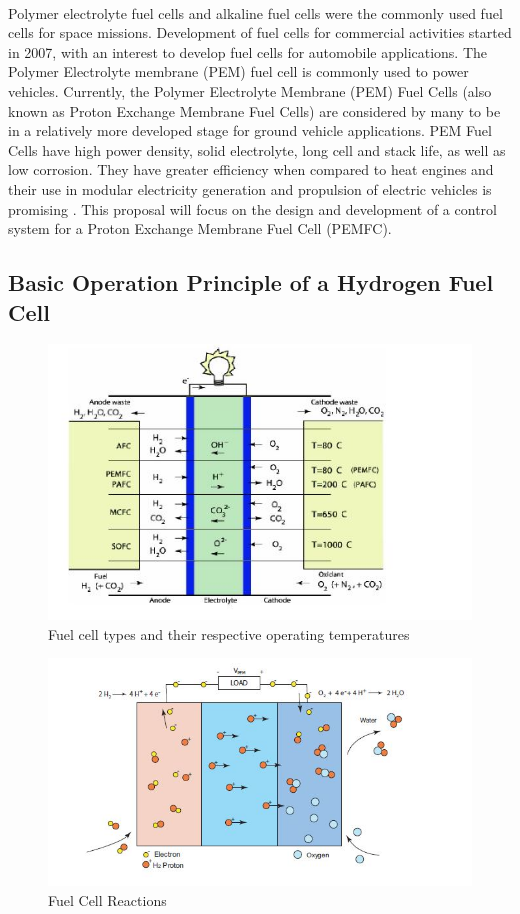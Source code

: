 \paragraph{}Polymer electrolyte fuel cells and alkaline fuel cells were the commonly used fuel cells for space missions. Development of fuel cells for commercial activities started in 2007, with an interest to develop fuel cells for automobile applications. The Polymer Electrolyte membrane (PEM) fuel cell is commonly used to power vehicles. Currently, the Polymer Electrolyte Membrane (PEM) Fuel Cells (also known as Proton Exchange Membrane Fuel Cells) are considered by many to be in a relatively more developed stage for ground vehicle applications. PEM Fuel Cells have high power density, solid electrolyte, long cell and stack life, as well as low corrosion. They have greater eﬃciency when compared to heat engines and their use in modular electricity generation and propulsion of electric vehicles is promising \cite{holze_supramanian_2007}. This proposal will focus on the design and development of a control system for a Proton Exchange Membrane Fuel Cell (PEMFC).

\subsection{Basic Operation Principle of a Hydrogen  Fuel Cell}
\begin{figure}[!h]
\includegraphics{Figures/Figure1}
\caption{Fuel cell types and their respective operating temperatures
\cite{stefanopoulou_mechatronics_nodate}}
\end{figure}
\begin{figure}[!h]
\includegraphics{Figures/Figure2}
\caption{Fuel Cell Reactions
\cite{pukrushpan_modeling_2003}}
\end{figure}
